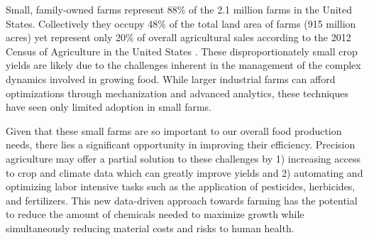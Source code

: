
Small, family-owned farms represent 88\% of the 2.1 million farms in the United States. Collectively they occupy 48\% of the total land area of farms (915 million acres) yet represent only 20\% of overall agricultural sales according to the 2012 Census of Agriculture in the United States \cite{USDANati49:online}. These disproportionately small crop yields are likely due to the challenges inherent in the management of the complex dynamics involved in growing food. While larger industrial farms can afford optimizations through mechanization and advanced analytics, these techniques have seen only limited adoption in small farms.

Given that these small farms are so important to our overall food production needs, there lies a significant opportunity in improving their efficiency. Precision agriculture may offer a partial solution to these challenges by 1) increasing access to crop and climate data which can greatly improve yields and 2) automating and optimizing labor intensive tasks such as the application of pesticides, herbicides, and fertilizers. This new data-driven approach towards farming has the potential to reduce the amount of chemicals needed to maximize growth while simultaneously reducing material costs and risks to human health.

